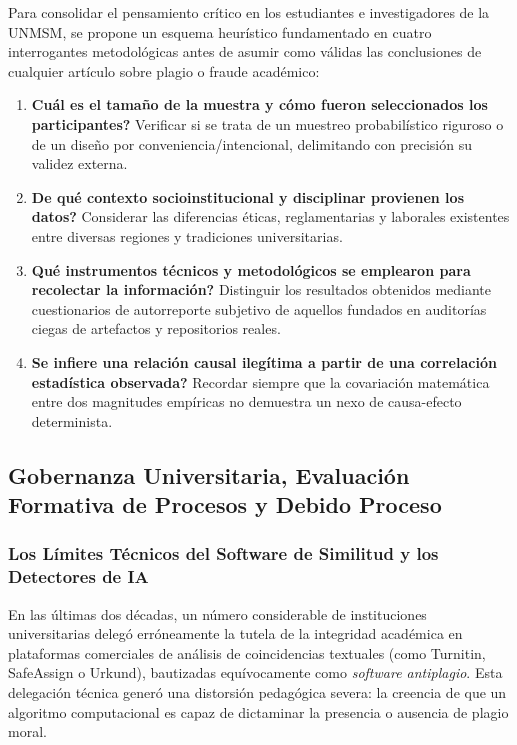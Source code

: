 Para consolidar el pensamiento crítico en los estudiantes e investigadores de la UNMSM, se propone un esquema heurístico fundamentado en cuatro interrogantes metodológicas antes de asumir como válidas las conclusiones de cualquier artículo sobre plagio o fraude académico:

\begin{enumerate}
    \item \textbf{\textquestiondown Cuál es el tamaño de la muestra y cómo fueron seleccionados los participantes?} Verificar si se trata de un muestreo probabilístico riguroso o de un diseño por conveniencia/intencional, delimitando con precisión su validez externa.
    \item \textbf{\textquestiondown De qué contexto socioinstitucional y disciplinar provienen los datos?} Considerar las diferencias éticas, reglamentarias y laborales existentes entre diversas regiones y tradiciones universitarias.
    \item \textbf{\textquestiondown Qué instrumentos técnicos y metodológicos se emplearon para recolectar la información?} Distinguir los resultados obtenidos mediante cuestionarios de autorreporte subjetivo de aquellos fundados en auditorías ciegas de artefactos y repositorios reales.
    \item \textbf{\textquestiondown Se infiere una relación causal ilegítima a partir de una correlación estadística observada?} Recordar siempre que la covariación matemática entre dos magnitudes empíricas no demuestra un nexo de causa-efecto determinista.
\end{enumerate}

\subsection{Gobernanza Universitaria, Evaluación Formativa de Procesos y Debido Proceso}

\subsubsection{Los Límites Técnicos del Software de Similitud y los Detectores de IA}

En las últimas dos décadas, un número considerable de instituciones universitarias delegó erróneamente la tutela de la integridad académica en plataformas comerciales de análisis de coincidencias textuales (como Turnitin, SafeAssign o Urkund), bautizadas equívocamente como \textsl{\guillemotleft software antiplagio\guillemotright}. Esta delegación técnica generó una distorsión pedagógica severa: la creencia de que un algoritmo computacional es capaz de dictaminar la presencia o ausencia de plagio moral.

